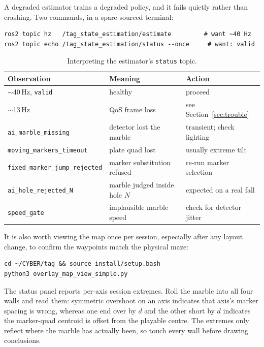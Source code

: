 \documentclass[11pt,a4paper]{article}
\newcommand{\cmd}[1]{\texttt{\small #1}}
\newcommand{\topicname}[1]{\texttt{\small #1}}
\begin{document}
A degraded estimator trains a degraded policy, and it fails quietly rather than
crashing. Two commands, in a spare sourced terminal:

\begin{lstlisting}
ros2 topic hz   /tag_state_estimation/estimate         # want ~40 Hz
ros2 topic echo /tag_state_estimation/status --once     # want: valid
\end{lstlisting}

\begin{table}[h]
\centering\small
\begin{tabular}{@{}lll@{}}
\toprule
\textbf{Observation} & \textbf{Meaning} & \textbf{Action} \\
\midrule
$\sim$40\,Hz, \cmd{valid} & healthy & proceed \\
$\sim$13\,Hz & QoS frame loss & see Section~\ref{sec:trouble} \\
\cmd{ai\_marble\_missing} & detector lost the marble & transient; check lighting \\
\cmd{moving\_markers\_timeout} & plate quad lost & usually extreme tilt \\
\cmd{fixed\_marker\_jump\_rejected} & marker substitution refused & re-run marker selection \\
\cmd{ai\_hole\_rejected\_N} & marble judged inside hole $N$ & expected on a real fall \\
\cmd{speed\_gate} & implausible marble speed & check for detector jitter \\
\bottomrule
\end{tabular}
\caption{Interpreting the estimator's \topicname{status} topic.}
\end{table}

It is also worth viewing the map once per session, especially after any layout
change, to confirm the waypoints match the physical maze:

\begin{lstlisting}
cd ~/CYBER/tag && source install/setup.bash
python3 overlay_map_view_simple.py
\end{lstlisting}

The status panel reports per-axis session extremes. Roll the marble into all four
walls and read them: symmetric overshoot on an axis indicates that axis's marker
spacing is wrong, whereas one end over by $d$ and the other short by $d$
indicates the marker-quad centroid is offset from the playable centre. The
extremes only reflect where the marble has actually been, so touch every wall
before drawing conclusions.
\end{document}
